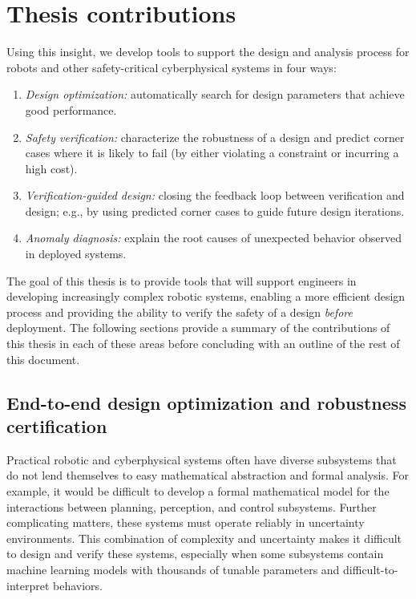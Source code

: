 \section{Thesis contributions}

Using this insight, we develop tools to support the design and analysis process for robots and other safety-critical cyberphysical systems in four ways:
\begin{enumerate}
    \item \textit{Design optimization:} automatically search for design parameters that achieve good performance.
    \item \textit{Safety verification:} characterize the robustness of a design and predict corner cases where it is likely to fail (by either violating a constraint or incurring a high cost).
    \item \textit{Verification-guided design:} closing the feedback loop between verification and design; e.g., by using predicted corner cases to guide future design iterations.
    \item \textit{Anomaly diagnosis:} explain the root causes of unexpected behavior observed in deployed systems.
\end{enumerate}
%
The goal of this thesis is to provide tools that will support engineers in developing increasingly complex robotic systems, enabling a more efficient design process and providing the ability to verify the safety of a design \textit{before} deployment. The following sections provide a summary of the contributions of this thesis in each of these areas before concluding with an outline of the rest of this document.

\subsection{End-to-end design optimization and robustness certification}

Practical robotic and cyberphysical systems often have diverse subsystems that do not lend themselves to easy mathematical abstraction and formal analysis. For example, it would be difficult to develop a formal mathematical model for the interactions between planning, perception, and control subsystems. Further complicating matters, these systems must operate reliably in uncertainty environments. This combination of complexity and uncertainty makes it difficult to design and verify these systems, especially when some subsystems contain machine learning models with thousands of tunable parameters and difficult-to-interpret behaviors.

